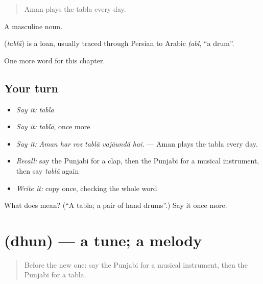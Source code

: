 \begin{quote}
Aman plays the tabla every day.
\end{quote}

A masculine noun.

\begin{cousinweb}
\textbf{} (\emph{tablā}) is a loan, usually traced through Persian to Arabic \emph{ṭabl}, \textquotedblleft{}a drum\textquotedblright{}.
\end{cousinweb}

\begin{grammarlens}[title={What you've built}]
One more word for this chapter.
\end{grammarlens}

\subsection*{Your turn}
\begin{itemize}
\raggedright
  \item \emph{Say it:} \emph{tablā}
  \item \emph{Say it:} \emph{tablā}, once more
  \item \emph{Say it:} \emph{Aman har roz tablā vajāundā hai.} — Aman plays the tabla every day.
  \item \emph{Recall:} say the Punjabi for a clap, then the Punjabi for a musical instrument, then say \emph{tablā} again
  \item \emph{Write it:} copy \textbf{} once, checking the whole word
\end{itemize}

\begin{tcolorbox}[breakable,colback=teal!4,colframe=teal!35!black,title={Before you move on}]
What does  mean? (\textquotedblleft{}A tabla; a pair of hand drums\textquotedblright{}.) Say it once more.
\end{tcolorbox}
\section[\texorpdfstring{\pa{ਧੁਨ} (dhun)}{ਧੁਨ (dhun)}]{ (dhun) — a tune; a melody}

\label{lesson:PA-C348-dhun}



\begin{quote}
Before the new one: say the Punjabi for a musical instrument, then the Punjabi for a tabla.
\end{quote}

